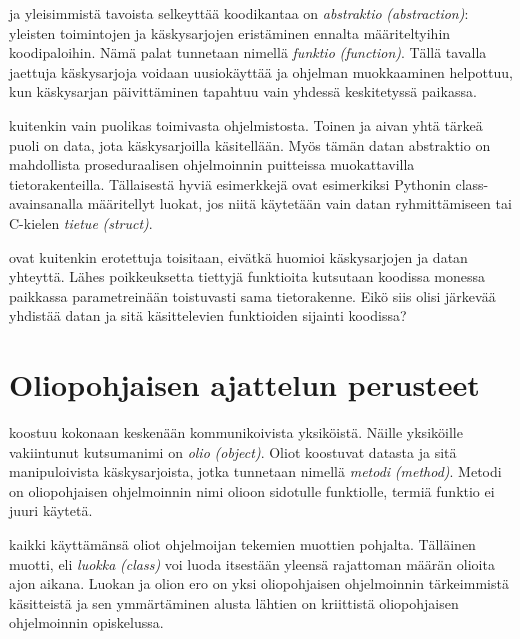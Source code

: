 \documentclass[a4paper,justified,notoc]{tufte-book}
\newcommand{\eng}[1]{\textit{(#1)}}
\newcommand{\new}[1]{\textit{\gls{#1}}}
\newcommand{\neweng}[2]{\new{#1} \eng{#2}}
\begin{document}
\begin{fullwidth}
 ja yleisimmistä tavoista selkeyttää koodikantaa on
\neweng{abstraktio}{abstraction}: yleisten toimintojen ja käskysarjojen eristäminen ennalta
määriteltyihin koodipaloihin. Nämä palat tunnetaan nimellä \neweng{funktio}{function}. Tällä
tavalla jaettuja käskysarjoja voidaan uusiokäyttää ja ohjelman muokkaaminen helpottuu, kun
käskysarjan päivittäminen tapahtuu vain yhdessä keskitetyssä paikassa.

 kuitenkin vain puolikas toimivasta ohjelmistosta. Toinen ja aivan
yhtä tärkeä puoli on data, jota käskysarjoilla käsitellään. Myös tämän datan abstraktio on
mahdollista proseduraalisen ohjelmoinnin puitteissa muokattavilla tietorakenteilla. Tällaisestä
hyviä esimerkkejä ovat esimerkiksi Pythonin class-avainsanalla määritellyt luokat, jos niitä
käytetään vain datan ryhmittämiseen tai C-kielen \neweng{tietue}{struct}.

 ovat kuitenkin erotettuja toisitaan, eivätkä huomioi
käskysarjojen ja datan yhteyttä. Lähes poikkeuksetta tiettyjä funktioita kutsutaan koodissa
monessa paikkassa parametreinään toistuvasti sama tietorakenne. Eikö siis olisi järkevää yhdistää
datan ja sitä käsittelevien funktioiden sijainti koodissa?


\section{Oliopohjaisen ajattelun perusteet}
\label{oliopohjaisesta ajattelusta}

 koostuu kokonaan keskenään kommunikoivista yksiköistä.
Näille yksiköille vakiintunut kutsumanimi on \neweng{olio}{object}. Oliot koostuvat datasta ja
sitä manipuloivista käskysarjoista, jotka tunnetaan nimellä \neweng{metodi}{method}. Metodi on
oliopohjaisen ohjelmoinnin nimi olioon sidotulle funktiolle, termiä \gls{funktio} ei juuri
käytetä.

 kaikki käyttämänsä oliot ohjelmoijan tekemien muottien pohjalta.
Tälläinen muotti, eli \neweng{luokka}{class} voi luoda itsestään yleensä rajattoman määrän olioita
ajon aikana. Luokan ja olion ero on yksi oliopohjaisen ohjelmoinnin tärkeimmistä käsitteistä ja
sen ymmärtäminen alusta lähtien on kriittistä oliopohjaisen ohjelmoinnin opiskelussa.


\end{fullwidth}
\end{document}
